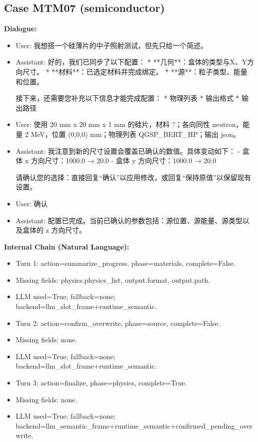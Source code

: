 \documentclass[11pt]{ctexart}
\begin{document}
\subsection{Case MTM07 (semiconductor)}
\textbf{Dialogue:}
\begin{itemize}
\item User: 我想搭一个硅薄片的中子照射测试，但先只给一个简述。
\item Assistant: 好的，我们已同步了以下配置：
*   **几何**：盒体的类型与X、Y方向尺寸。
*   **材料**：已选定材料并完成绑定。
*   **源**：粒子类型、能量和位置。

接下来，还需要您补充以下信息才能完成配置：
*   物理列表
*   输出格式
*   输出路径
\item User: 使用 20 mm x 20 mm x 1 mm 的硅片，材料 ?；各向同性 neutron，能量 2 MeV，位置 (0,0,0) mm；物理列表 QGSP\_BERT\_HP；输出 json。
\item Assistant: 我注意到新的尺寸设置会覆盖已确认的数值。具体变动如下：
- 盒体 x 方向尺寸：1000.0 → 20.0
- 盒体 y 方向尺寸：1000.0 → 20.0

请确认您的选择：直接回复“确认”以应用修改，或回复“保持原值”以保留现有设置。
\item User: 确认
\item Assistant: 配置已完成。当前已确认的参数包括：源位置、源能量、源类型以及盒体的 z 方向尺寸。
\end{itemize}
\textbf{Internal Chain (Natural Language):}
\begin{itemize}
\item Turn 1: action=summarize\_progress, phase=materials, complete=False.
\item Missing fields: physics.physics\_list, output.format, output.path.
\item LLM used=True; fallback=none; backend=llm\_slot\_frame+runtime\_semantic.
\item Turn 2: action=confirm\_overwrite, phase=source, complete=False.
\item Missing fields: none.
\item LLM used=True; fallback=none; backend=llm\_slot\_frame+runtime\_semantic.
\item Turn 3: action=finalize, phase=physics, complete=True.
\item Missing fields: none.
\item LLM used=True; fallback=none; backend=llm\_semantic\_frame+runtime\_semantic+confirmed\_pending\_overwrite.
\end{itemize}
\end{document}
